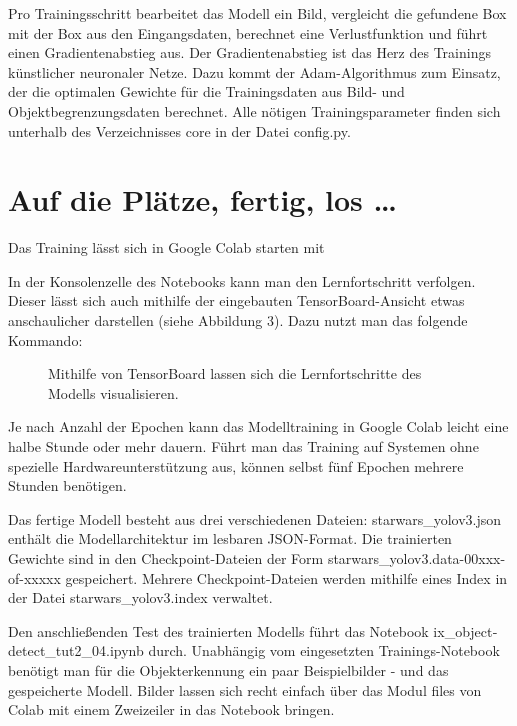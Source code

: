 Pro Trainingsschritt bearbeitet das Modell ein Bild, vergleicht die gefundene Box mit der Box aus den Eingangsdaten, berechnet eine Verlustfunktion und führt einen Gradientenabstieg aus. Der Gradientenabstieg ist das Herz des Trainings künstlicher neuronaler Netze. Dazu kommt der Adam-Algorithmus zum Einsatz, der die optimalen Gewichte für die Trainingsdaten aus Bild- und Objektbegrenzungsdaten berechnet. Alle nötigen Trainingsparameter finden sich unterhalb des Verzeichnisses core in der Datei config.py. 

\section{Auf die Plätze, fertig, los \ldots}

Das Training lässt sich in Google Colab starten mit 


In der Konsolenzelle des Notebooks kann man den Lernfortschritt verfolgen. Dieser lässt sich auch mithilfe der eingebauten TensorBoard-­Ansicht etwas anschaulicher darstellen (siehe Abbildung 3). Dazu nutzt man das folgende Kommando: 

	
	
\begin{figure}
	\caption{Mithilfe von TensorBoard lassen sich die Lernfortschritte des Modells visualisieren.}
\end{figure}	
	
	
Je nach Anzahl der Epochen kann das Modelltraining in Google Colab leicht eine halbe Stunde oder mehr dauern. Führt man das Training auf Systemen ohne spezielle Hardwareunterstützung aus, können selbst fünf Epochen mehrere Stunden benötigen.  

Das fertige Modell besteht aus drei verschiedenen Dateien: starwars\_yolov3.json enthält die Modellarchitektur im lesbaren JSON-Format. Die trainierten Gewichte sind in den Checkpoint-Dateien der Form starwars\_yolov3.data-00xxx-of-xxxxx gespeichert. Mehrere Checkpoint-Dateien werden mithilfe eines Index in der Datei starwars\_yolov3.index verwaltet. 


Den anschließenden Test des trainierten Modells führt das Notebook ix\_object­detect\_tut2\_04.ipynb durch. Unabhängig vom eingesetzten Trainings-Notebook benötigt man für die Objekterkennung ein paar Beispielbilder -  und das gespeicherte Modell. Bilder lassen sich recht einfach über das Modul files von Colab mit einem Zweizeiler in das Notebook bringen.  

